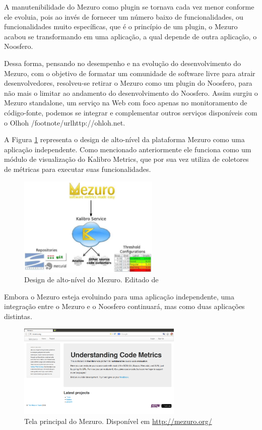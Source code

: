 A manutenibilidade do Mezuro como plugin se tornava cada vez menor conforme ele evoluia, pois ao invés de fornecer um número baixo de funcionalidades, ou funcionalidades muito específicas, que é o princípio de um plugin, o Mezuro acabou se transformando em uma aplicação, a qual depende de outra aplicação, o Noosfero. 

Dessa forma, pensando no desempenho e na evolução do desenvolvimento do Mezuro, com o objetivo de formatar um comunidade de software livre para atrair desenvolvedores, resolveu-se retirar o Mezuro como um plugin do Noosfero, para não mais o limitar ao andamento do desenvolvimento do Noosfero. Assim surgiu o Mezuro standalone, um serviço na Web com foco apenas no monitoramento de código-fonte, podemos se integrar e complementar outros serviços disponíveis com o Olhoh /footnote{/url{http://ohloh.net}}.

A Figura \ref{mezuro-design} representa o design de alto-nível da plataforma Mezuro como uma aplicação independente. Como mencionado anteriormente ele funciona como um módulo de visualização do Kalibro Metrics, que por sua vez utiliza de coletores de métricas para executar suas funcionalidades.

\graphicspath{{figuras/}}
\begin{figure}[H]
\centering
\includegraphics[width=0.6\textwidth]{mezuro-standalone-design}
\caption{Design de alto-nível do Mezuro. Editado de \cite{meirelles2010mezuro}}
\label{mezuro-design}
\end{figure}

Embora o Mezuro esteja evoluindo para uma aplicação independente, uma integração entre o Mezuro e o Noosfero continuará, mas como duas aplicações distintas.

\graphicspath{{figuras/}}
\begin{figure}[H]
\centering
\includegraphics[width=0.7\textwidth]{mezuro-standalone}
\caption{Tela principal do Mezuro. Disponível em \url{http://mezuro.org/}}
\label{mezuro}
\end{figure}




